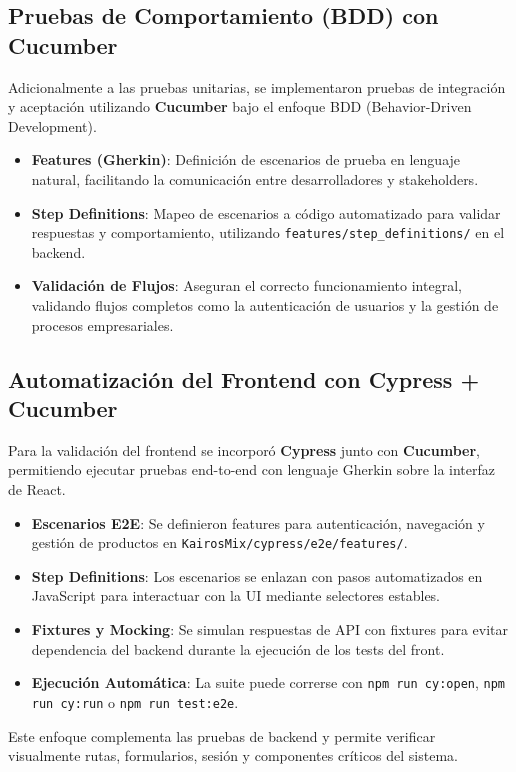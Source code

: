 \documentclass[12pt,a4paper]{article}
\begin{document}
\subsection{Pruebas de Comportamiento (BDD) con Cucumber}
Adicionalmente a las pruebas unitarias, se implementaron pruebas de integración y aceptación utilizando \textbf{Cucumber} bajo el enfoque BDD (Behavior-Driven Development).
\begin{itemize}
    \item \textbf{Features (Gherkin)}: Definición de escenarios de prueba en lenguaje natural, facilitando la comunicación entre desarrolladores y stakeholders.
    \item \textbf{Step Definitions}: Mapeo de escenarios a código automatizado para validar respuestas y comportamiento, utilizando \texttt{features/step\_definitions/} en el backend.
    \item \textbf{Validación de Flujos}: Aseguran el correcto funcionamiento integral, validando flujos completos como la autenticación de usuarios y la gestión de procesos empresariales.
\end{itemize}

\subsection{Automatización del Frontend con Cypress + Cucumber}
Para la validación del frontend se incorporó \textbf{Cypress} junto con \textbf{Cucumber}, permitiendo ejecutar pruebas end-to-end con lenguaje Gherkin sobre la interfaz de React.
\begin{itemize}
    \item \textbf{Escenarios E2E}: Se definieron features para autenticación, navegación y gestión de productos en \texttt{KairosMix/cypress/e2e/features/}.
    \item \textbf{Step Definitions}: Los escenarios se enlazan con pasos automatizados en JavaScript para interactuar con la UI mediante selectores estables.
    \item \textbf{Fixtures y Mocking}: Se simulan respuestas de API con fixtures para evitar dependencia del backend durante la ejecución de los tests del front.
    \item \textbf{Ejecución Automática}: La suite puede correrse con \texttt{npm run cy:open}, \texttt{npm run cy:run} o \texttt{npm run test:e2e}.
\end{itemize}
Este enfoque complementa las pruebas de backend y permite verificar visualmente rutas, formularios, sesión y componentes críticos del sistema.
\end{document}
